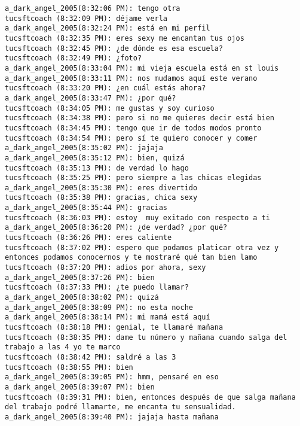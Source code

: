 \begin{verbatim}
a_dark_angel_2005(8:32:06 PM): tengo otra
tucsftcoach (8:32:09 PM): déjame verla
a_dark_angel_2005(8:32:24 PM): está en mi perfil
tucsftcoach (8:32:35 PM): eres sexy me encantan tus ojos
tucsftcoach (8:32:45 PM): ¿de dónde es esa escuela?
tucsftcoach (8:32:49 PM): ¿foto?
a_dark_angel_2005(8:33:04 PM): mi vieja escuela está en st louis
a_dark_angel_2005(8:33:11 PM): nos mudamos aquí este verano
tucsftcoach (8:33:20 PM): ¿en cuál estás ahora?
a_dark_angel_2005(8:33:47 PM): ¿por qué?
tucsftcoach (8:34:05 PM): me gustas y soy curioso
tucsftcoach (8:34:38 PM): pero si no me quieres decir está bien
tucsftcoach (8:34:45 PM): tengo que ir de todos modos pronto
tucsftcoach (8:34:54 PM): pero sí te quiero conocer y comer
a_dark_angel_2005(8:35:02 PM): jajaja
a_dark_angel_2005(8:35:12 PM): bien, quizá
tucsftcoach (8:35:13 PM): de verdad lo hago
tucsftcoach (8:35:25 PM): pero siempre a las chicas elegidas
a_dark_angel_2005(8:35:30 PM): eres divertido
tucsftcoach (8:35:38 PM): gracias, chica sexy
a_dark_angel_2005(8:35:44 PM): gracias
tucsftcoach (8:36:03 PM): estoy  muy exitado con respecto a ti
a_dark_angel_2005(8:36:20 PM): ¿de verdad? ¿por qué?
tucsftcoach (8:36:26 PM): eres caliente
tucsftcoach (8:37:02 PM): espero que podamos platicar otra vez y entonces podamos conocernos y te mostraré qué tan bien lamo
tucsftcoach (8:37:20 PM): adios por ahora, sexy 
a_dark_angel_2005(8:37:26 PM): bien
tucsftcoach (8:37:33 PM): ¿te puedo llamar?
a_dark_angel_2005(8:38:02 PM): quizá
a_dark_angel_2005(8:38:09 PM): no esta noche
a_dark_angel_2005(8:38:14 PM): mi mamá está aquí
tucsftcoach (8:38:18 PM): genial, te llamaré mañana
tucsftcoach (8:38:35 PM): dame tu número y mañana cuando salga del trabajo a las 4 yo te marco
tucsftcoach (8:38:42 PM): saldré a las 3
tucsftcoach (8:38:55 PM): bien
a_dark_angel_2005(8:39:05 PM): hmm, pensaré en eso
a_dark_angel_2005(8:39:07 PM): bien
tucsftcoach (8:39:31 PM): bien, entonces después de que salga mañana del trabajo podré llamarte, me encanta tu sensualidad.
a_dark_angel_2005(8:39:40 PM): jajaja hasta mañana



\end{verbatim}
